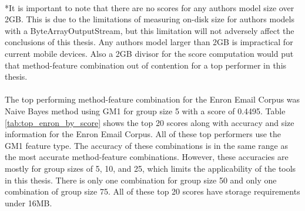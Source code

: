 \paragraph{}*It is important to note that there are no scores for any authors model size over 2GB.  This is due to the limitations of measuring on-disk size for authors models with a ByteArrayOutputStream, but this limitation will not adversely affect the conclusions of this thesis.  Any authors model larger than 2GB is impractical for current mobile devices.  Also a 2GB divisor for the score computation would put that method-feature combination out of contention for a top performer in this thesis.

\paragraph*{}  The top performing method-feature combination for the Enron Email Corpus was Naive Bayes method using GM1 for group size 5 with a score of 0.4495.  Table \ref{tab:top_enron_by_score} shows the top 20 scores along with accuracy and size information for the Enron Email Corpus.  All of these top performers use the GM1 feature type. The accuracy of these combinations is in the same range as the most accurate method-feature combinations. However, these accuracies are mostly for group sizes of 5, 10, and 25, which limits the applicability of the tools in this thesis.  There is only one combination for group size 50 and only one combination of group size 75.  All of these top 20 scores have storage requirements under 16MB.


